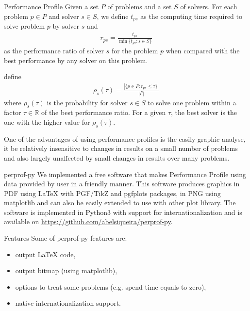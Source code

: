 \documentclass[paperwidth=90cm,paperheight=120cm,portrait]{baposter}
\begin{document}
\begin{poster}
\begin{posterbox}[name=perprof,below=intro]{Performance Profile}
        Given a set $P$ of problems and a set $S$ of solvers. For each problem $p
        \in P$ and solver $s \in S$, we define $t_{ps}$ as the computing time
        required to solve problem $p$ by solver $s$ and
        \begin{align*}
          r_{ps} = \frac{t_{ps}}{\min\{t_{ps}: s \in S\}}
        \end{align*}
        as the performance ratio of solver $s$ for the problem $p$ when compared
        with the best performance by any solver on this problem.

        \citeauthor{Dolan2001} define
        \begin{align*}
          \rho_s(\tau) = \frac{| \{p \in P: r_{ps} \leq \tau\} |}{| P |}
        \end{align*}
        where $\rho_s(\tau)$ is the probability for solver $s \in S$ to solve one
        problem within a factor $\tau \in \mathbb{R}$ of the best performance
        ratio. For a given $\tau$, the best solver is the one with the higher
        value for $\rho_s(\tau)$.

        One of the advantages of using performance profiles is the easily graphic
        analyse, it be relatively insensitive to changes in results on a small
        number of problems and also largely unaffected by small changes in
        results over many problems.
        \end{posterbox}

       \begin{posterbox}[name=perprof-py,below=perprof] {perprof-py}
       We implemented a free software that makes Performance
        Profile using data provided by user in a friendly manner. This software
        produces graphics in PDF using LaTeX with PGF/TikZ\nocite{TikZ} and
        pgfplots\nocite{pgfplots} packages, in PNG using
        matplotlib\nocite{Hunter:2007} and can also be easily extended to use with
        other plot library. The software is implemented in Python3 with support
        for internationalization and is available on
        \url{https://github.com/abelsiqueira/perprof-py}.
      \end{posterbox}

    \begin{posterbox}[name=features,below=perprof-py]{Features}
        Some of perprof-py features are:
        \begin{itemize}
          \item output LaTeX code,
          \item output bitmap (using matplotlib),
          \item options to treat some problems (e.g. spend time equals to
            zero),
          \item native internationalization support.


\end{itemize}
\end{posterbox}
\end{poster}
\end{document}
